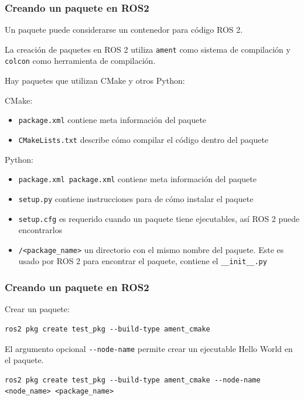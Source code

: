 \begin{frame}[fragile]
	\frametitle{Creando un paquete en ROS2}
	
Un paquete puede considerarse un contenedor para código ROS 2. 

La creación de paquetes en ROS 2 utiliza \lstinline|ament| como sistema de compilación y \lstinline|colcon| como herramienta de compilación.

Hay paquetes que utilizan CMake y otros Python:

CMake:
\begin{itemize}
	\item \lstinline|package.xml| contiene meta información del paquete

	\item \lstinline|CMakeLists.txt| describe cómo compilar el código dentro del paquete
\end{itemize}

Python:
\begin{itemize}
\item \lstinline|package.xml package.xml| contiene meta información del paquete

\item \lstinline|setup.py| contiene instrucciones para de cómo instalar el paquete

\item \lstinline|setup.cfg| es requerido cuando un paquete tiene ejecutables, así ROS 2 puede encontrarlos

\item \lstinline|/<package_name>| un directorio con el mismo nombre del paquete. Este es usado por ROS 2 para encontrar el paquete, contiene el \lstinline|__init__.py|
\end{itemize}
\end{frame}

\begin{frame}[fragile]
	\frametitle{Creando un paquete en ROS2}
	
Crear un paquete:
\begin{lstlisting}[style=bash] 
ros2 pkg create test_pkg --build-type ament_cmake
\end{lstlisting}

El argumento opcional \lstinline|--node-name| permite crear un ejecutable Hello World en el paquete.
\begin{lstlisting}[style=bash] 
ros2 pkg create test_pkg --build-type ament_cmake --node-name <node_name> <package_name>
\end{lstlisting}

\end{frame}


